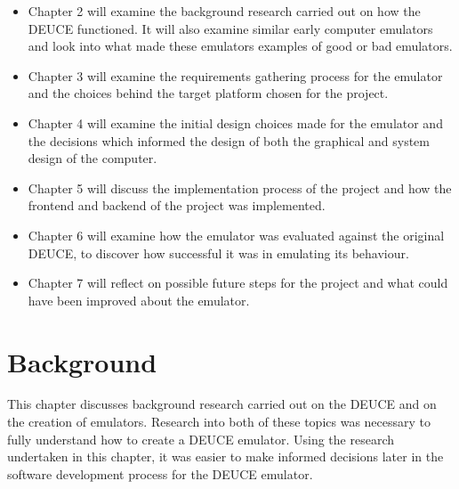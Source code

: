 \documentclass{l4proj}
\begin{document}
\begin{itemize}
	\item Chapter 2 will examine the background research carried out on how the DEUCE functioned. It will also examine similar early computer emulators and look into what made these emulators examples of good or bad emulators.
	\item Chapter 3 will examine the requirements gathering process for the emulator and the choices behind the target platform chosen for the project.
	\item Chapter 4 will examine the initial design choices made for the emulator and the decisions which informed the design of both the graphical and system design of the computer.
	\item Chapter 5 will discuss the implementation process of the project and how the frontend and backend of the project was implemented.
	\item Chapter 6 will examine how the emulator was evaluated against the original DEUCE, to discover how successful it was in emulating its behaviour.
	\item Chapter 7 will reflect on possible future steps for the project and what could have been improved about the emulator. 
\end{itemize}

\chapter{Background}
This chapter discusses background research carried out on the DEUCE and on the creation of emulators. Research into both of these topics was necessary to fully understand how to create a DEUCE emulator. Using the research undertaken in this chapter, it was easier to make informed decisions later in the software development process for the DEUCE emulator.
\end{document}
